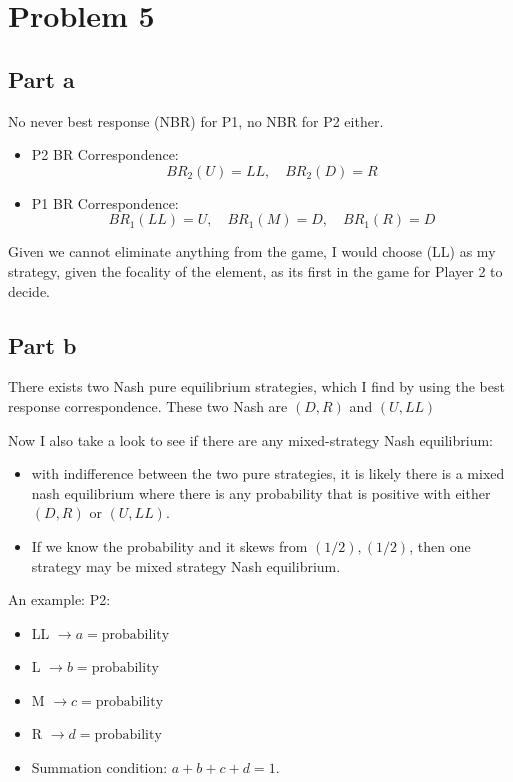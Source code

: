 \documentclass{article}
\begin{document}
\section{Problem 5}

\subsection{Part a}
No never best response (NBR) for P1, no NBR for P2 either. 
\begin{itemize}
    \item P2 BR Correspondence:
    \[
    BR_2(U) = LL, \quad BR_2(D) = R
    \]
    \item P1 BR Correspondence:
    \[
    BR_1(LL) = U, \quad BR_1(M) = D, \quad BR_1(R) = D
    \]
\end{itemize}

Given we cannot eliminate anything from the game, I would choose (LL) as my strategy, given the focality of the element, as its first in the game for Player 2 to decide. 

\subsection{Part b}

There exists two Nash pure equilibrium strategies, which I find by using the best response correspondence.  These two Nash are $(D,R)$ and $(U,LL)$

Now I also take a look to see if there are any mixed-strategy Nash equilibrium:
    \begin{itemize}
        \item with indifference between the two pure strategies, it is likely there is a mixed nash equilibrium where there is any probability that is positive  with either \( (D, R) \) or $(U,LL)$. 
        \item If we know the probability and it skews from \( (1/2), (1/2) \), then one strategy may be mixed strategy Nash equilibrium.
    \end{itemize}

An example: P2:
\begin{itemize}
    \item LL \( \to a = \text{probability} \)
    \item L \( \to b = \text{probability} \)
    \item M \( \to c = \text{probability} \)
    \item R \( \to d = \text{probability} \)
    \item Summation condition: \( a + b + c + d = 1 \).
\end{itemize}
\end{document}
